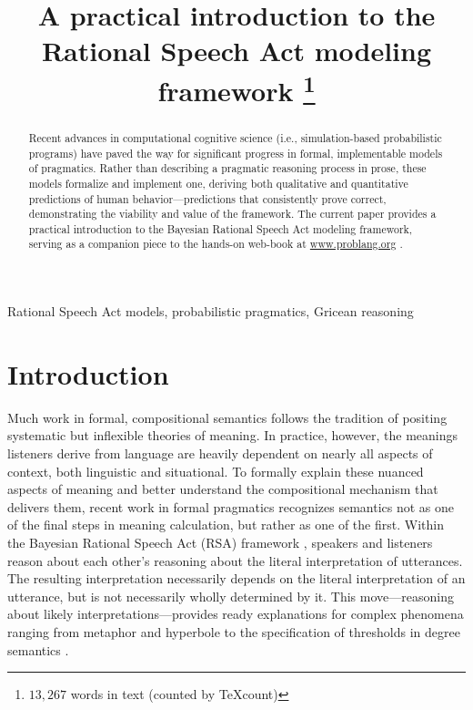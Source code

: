 \documentclass{sp}
\title[Practical introduction to RSA]{A practical introduction to the Rational Speech Act modeling framework%
	\thanks{$13,267$ words in text (counted by \TeX count)}
	}
\author[]{%
}
\begin{document}
\maketitle

\begin{abstract}
	Recent advances in computational cognitive science (i.e., simulation-based probabilistic programs) have paved the way for significant progress in formal, implementable models of pragmatics. Rather than describing a pragmatic reasoning process in prose, these models formalize and implement one, deriving both qualitative and quantitative predictions of human behavior---predictions that consistently prove correct, demonstrating the viability and value of the framework. The current paper provides a practical introduction to the Bayesian Rational Speech Act modeling framework, serving as a companion piece to the hands-on web-book at \href{https://www.problang.org}{www.problang.org} \citep{problang}. %
\end{abstract}

\begin{keywords}
	Rational Speech Act models, probabilistic pragmatics, Gricean reasoning
\end{keywords}


\section{Introduction}

Much work in formal, compositional semantics follows the tradition of positing systematic but inflexible theories of meaning. In practice, however, the meanings listeners derive from language are heavily dependent on nearly all aspects of context, both linguistic and situational. To formally explain these nuanced aspects of meaning and better understand the compositional mechanism that delivers them, recent work in formal pragmatics recognizes semantics not as one of the final steps in meaning calculation, but rather as one of the first. Within the Bayesian Rational Speech Act (RSA) framework \citep{goodmanfrank2016,frankejaeger2016}, speakers and listeners reason about each other's reasoning about the literal interpretation of utterances. The resulting interpretation necessarily depends on the literal interpretation of an utterance, but is not necessarily wholly determined by it. This move---reasoning about likely interpretations---provides ready explanations for complex phenomena ranging from metaphor \citep{kaoetal2014metaphor} and hyperbole \citep{kaoetal2014} to the specification of thresholds in degree semantics \citep{lassitergoodman2013}.
\end{document}
